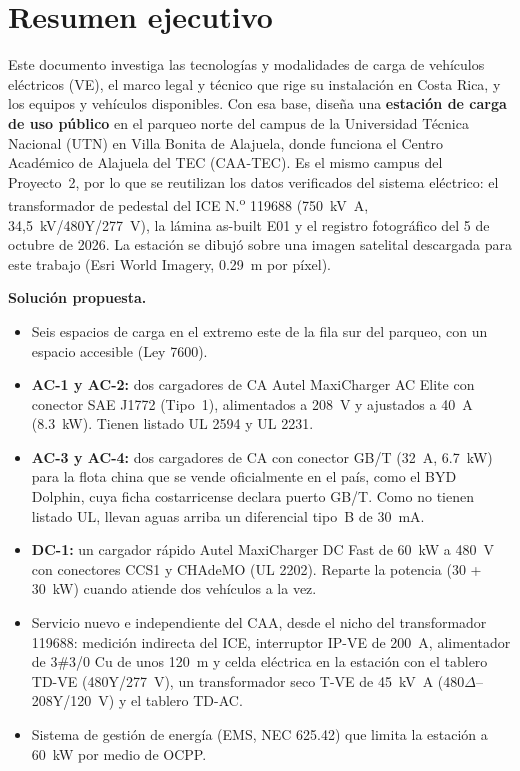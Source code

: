 \section{Resumen ejecutivo}

Este documento investiga las tecnologías y modalidades de carga de vehículos eléctricos (VE), el marco legal y técnico que rige su instalación en Costa Rica, y los equipos y vehículos disponibles. Con esa base, diseña una \textbf{estación de carga de uso público} en el parqueo norte del campus de la Universidad Técnica Nacional (UTN) en Villa Bonita de Alajuela, donde funciona el Centro Académico de Alajuela del TEC (CAA-TEC). Es el mismo campus del Proyecto~2, por lo que se reutilizan los datos verificados del sistema eléctrico: el transformador de pedestal del ICE N.\textsuperscript{o} 119688 (\SI{750}{\kilo\volt\ampere}, 34,5~kV/480Y/277~V), la lámina as-built E01 y el registro fotográfico del 5 de octubre de 2026. La estación se dibujó sobre una imagen satelital descargada para este trabajo (Esri World Imagery, \SI{0.29}{\meter} por píxel).

\textbf{Solución propuesta.}
\begin{itemize}
\item Seis espacios de carga en el extremo este de la fila sur del parqueo, con un espacio accesible (Ley 7600).
\item \textbf{AC-1 y AC-2:} dos cargadores de CA Autel MaxiCharger AC Elite con conector SAE J1772 (Tipo~1), alimentados a 208~V y ajustados a \SI{40}{\ampere} (\SI{8.3}{\kilo\watt}). Tienen listado UL 2594 y UL 2231.
\item \textbf{AC-3 y AC-4:} dos cargadores de CA con conector GB/T (\SI{32}{\ampere}, \SI{6.7}{\kilo\watt}) para la flota china que se vende oficialmente en el país, como el BYD Dolphin, cuya ficha costarricense declara puerto GB/T. Como no tienen listado UL, llevan aguas arriba un diferencial tipo~B de 30~mA.
\item \textbf{DC-1:} un cargador rápido Autel MaxiCharger DC Fast de \SI{60}{\kilo\watt} a 480~V con conectores CCS1 y CHAdeMO (UL 2202). Reparte la potencia (30 + \SI{30}{\kilo\watt}) cuando atiende dos vehículos a la vez.
\item Servicio nuevo e independiente del CAA, desde el nicho del transformador 119688: medición indirecta del ICE, interruptor IP-VE de \SI{200}{\ampere}, alimentador de 3\#3/0 Cu de unos \SI{120}{\meter} \supuesto{} y celda eléctrica en la estación con el tablero TD-VE (480Y/277~V), un transformador seco T-VE de \SI{45}{\kilo\volt\ampere} (480$\Delta$--208Y/120~V) y el tablero TD-AC.
\item Sistema de gestión de energía (EMS, NEC 625.42) que limita la estación a \SI{60}{\kilo\watt} por medio de OCPP.
\end{itemize}

